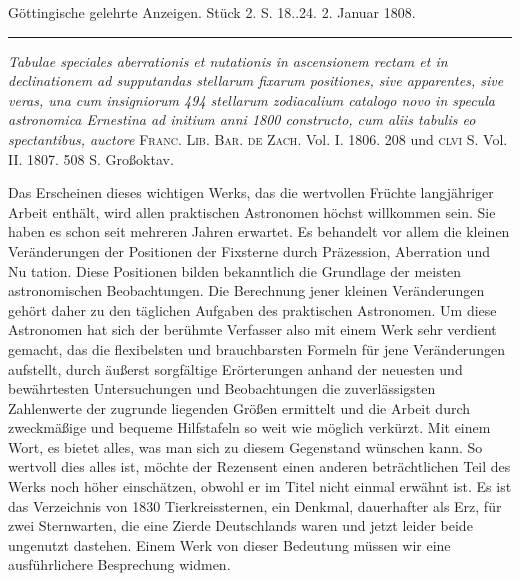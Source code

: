 \clearpage
{}
\hypertarget{native-494-lower}{}\label{native-494-lower}
\begin{center}
\small Göttingische gelehrte Anzeigen. Stück 2. S. 18..24. 2. Januar 1808.\\[3pt]
\rule{.72\linewidth}{.3pt}
\end{center}

\emph{Tabulae speciales aberrationis et nutationis in ascensionem rectam et in declinationem ad supputandas stellarum fixarum positiones, sive apparentes, sive veras, una cum insigniorum 494 stellarum zodiacalium catalogo novo in specula astronomica Ernestina ad initium anni \textup{1800} constructo, cum aliis tabulis eo spectantibus, auctore} \textsc{Franc. Lib. Bar. de Zach}. Vol. I. 1806. 208 und \textsc{clvi} S. Vol. II. 1807. 508 S. Großoktav.

Das Erscheinen dieses wichtigen Werks, das die wertvollen Früchte langjähriger Arbeit enthält, wird allen praktischen Astronomen höchst willkommen sein. Sie haben es schon seit mehreren Jahren erwartet. Es behandelt vor allem die kleinen Veränderungen der Positionen der Fixsterne durch Präzession, Aberration und Nu%
%
tation. Diese Positionen bilden bekanntlich die Grundlage der meisten astronomischen Beobachtungen. Die Berechnung jener kleinen Veränderungen gehört daher zu den täglichen Aufgaben des praktischen Astronomen. Um diese Astronomen hat sich der berühmte Verfasser also mit einem Werk sehr verdient gemacht, das die flexibelsten und brauchbarsten Formeln für jene Veränderungen aufstellt, durch äußerst sorgfältige Erörterungen anhand der neuesten und bewährtesten Untersuchungen und Beobachtungen die zuverlässigsten Zahlenwerte der zugrunde liegenden Größen ermittelt und die Arbeit durch zweckmäßige und bequeme Hilfstafeln so weit wie möglich verkürzt. Mit einem Wort, es bietet alles, was man sich zu diesem Gegenstand wünschen kann. So wertvoll dies alles ist, möchte der Rezensent einen anderen beträchtlichen Teil des Werks noch höher einschätzen, obwohl er im Titel nicht einmal erwähnt ist. Es ist das Verzeichnis von 1830 Tierkreissternen, ein Denkmal, dauerhafter als Erz, für zwei Sternwarten, die eine Zierde Deutschlands waren und jetzt leider beide ungenutzt dastehen. Einem Werk von dieser Bedeutung müssen wir eine ausführlichere Besprechung widmen.

